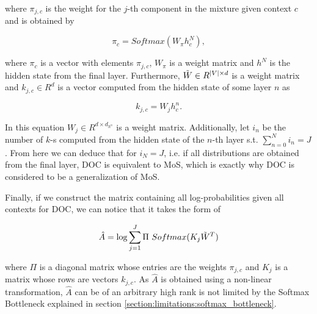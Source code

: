 where $ \pi_{j, c} $ is the weight for the $ j $-th component in the mixture given context $ c $ and is obtained by

\begin{displaymath}
    \pi_{c} = Softmax(W_\pi h^N_c),
\end{displaymath}

where $ \pi_{c} $ is a vector with elements $ \pi_{j, c} $, $ W_\pi $ is a weight matrix and $ h^N $ is the hidden state from the final layer. Furthermore, $ \Tilde{W} \in R^{|V| \times d} $ is a weight matrix and $ k_{j,c} \in R^d $ is a vector computed from the hidden state of some layer $ n $ as

\begin{displaymath}
    k_{j, c} = W_j h^n_c.
\end{displaymath}

In this equation $ W_j \in R^{d \times d_{h^n}} $ is a weight matrix. Additionally, let $ i_n $ be the number of $ k $-s computed from the hidden state of the $ n $-th layer s.t. $ \sum_{n=0}^N i_n = J $. From here we can deduce that for $ i_N = J $, i.e. if all distributions are obtained from the final layer, DOC is equivalent to MoS, which is exactly why DOC is considered to be a generalization of MoS.

Finally, if we construct the matrix containing all log-probabilities given all contexts for DOC, we can notice that it takes the form of

\begin{displaymath}
    \hat{A} = \log \sum_{j=1}^J \Pi \ Softmax(K_j \Tilde{W}^T)
\end{displaymath}

where $ \Pi $ is a diagonal matrix whose entries are the weights $ \pi_{j, c} $ and $ K_j $ is a matrix whose rows are vectors $ k_{j,c} $. As $ \hat{A} $ is obtained using a non-linear transformation, $ \hat{A} $ can be of an arbitrary high rank is not limited by the Softmax Bottleneck explained in section \ref{section:limitations:softmax_bottleneck}.
